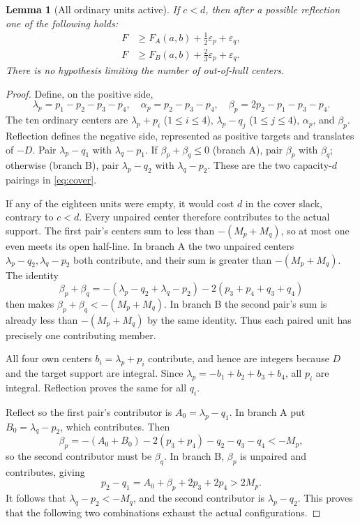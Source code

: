 \documentclass[11pt,a4paper]{article}
\newtheorem{lemma}[theorem]{Lemma}
\begin{document}
\begin{lemma}[All ordinary units active]\label{lem:active}
If $c<d$, then after a possible reflection one of the following holds:
\begin{align}
 F&\ge F_A(a,b)+\tfrac12\varepsilon_p+\varepsilon_q,\label{eq:FA}\\
 F&\ge F_B(a,b)+\tfrac23\varepsilon_p+\varepsilon_q.\label{eq:FB}
\end{align}
There is no hypothesis limiting the number of out-of-hull centers.
\end{lemma}
\begin{proof}
Define, on the positive side,
\[
 \lambda_p=p_1-p_2-p_3-p_4,\quad
 \alpha_p=p_2-p_3-p_4,\quad\beta_p=2p_2-p_1-p_3-p_4.
\]
The ten ordinary centers are $\lambda_p+p_i$ ($1\le i\le4$),
$\lambda_p-q_j$ ($1\le j\le4$), $\alpha_p$, and $\beta_p$.
Reflection defines the negative side, represented as positive targets
and translates of $-D$. Pair $\lambda_p-q_1$ with $\lambda_q-p_1$.
If $\beta_p+\beta_q\le0$ (branch A), pair $\beta_p$ with $\beta_q$;
otherwise (branch B), pair $\lambda_p-q_2$ with $\lambda_q-p_2$.
These are the two capacity-$d$ pairings in \eqref{eq:cover}.

If any of the eighteen units were empty, it would cost $d$ in the cover
slack, contrary to $c<d$. Every unpaired center therefore contributes to
the actual support. The first pair's centers sum to less than
$-(M_p+M_q)$, so at most one even meets its open half-line. In branch A
the two unpaired centers $\lambda_p-q_2,\lambda_q-p_2$ both contribute,
and their sum is greater than $-(M_p+M_q)$. The identity
\[
 \beta_p+\beta_q=-(\lambda_p-q_2+\lambda_q-p_2)
                  -2(p_3+p_4+q_3+q_4)
\]
then makes $\beta_p+\beta_q<-(M_p+M_q)$. In branch B the second pair's
sum is already less than $-(M_p+M_q)$ by the same identity. Thus each
paired unit has precisely one contributing member.

All four own centers $b_i=\lambda_p+p_i$ contribute, and hence are
integers because $D$ and the target support are integral. Since
$\lambda_p=-b_1+b_2+b_3+b_4$, all $p_i$ are integral. Reflection proves
the same for all $q_i$.

Reflect so the first pair's contributor is $A_0=\lambda_p-q_1$.
In branch A put $B_0=\lambda_q-p_2$, which contributes. Then
\[
 \beta_p=-(A_0+B_0)-2(p_3+p_4)-q_2-q_3-q_4<-M_p,
\]
so the second contributor must be $\beta_q$. In branch B, $\beta_p$
is unpaired and contributes, giving
\[
 p_2-q_1=A_0+\beta_p+2p_3+2p_4>2M_p.
\]
It follows that $\lambda_q-p_2<-M_q$, and the second contributor is
$\lambda_p-q_2$. This proves that the following two combinations exhaust
the actual configurations.


\end{proof}
\end{document}

